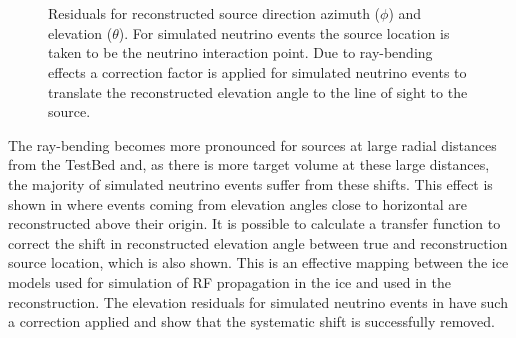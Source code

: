 \begin{figure}[htpb]
  \hfill
  \\
  \hfill
  \\
  \hfill
  \caption{Residuals for reconstructed source direction azimuth ($\phi$) and elevation ($\theta$). For simulated neutrino events the source location is taken to be the neutrino interaction point. Due to ray-bending effects a correction factor is applied for simulated neutrino events to translate the reconstructed elevation angle to the line of sight to the source.}
  \label{fig:analysis:Reconstructed:CSW-Residuals}
\end{figure}


The ray-bending becomes more pronounced for sources at large radial distances from the TestBed and, as there is more target volume at these large distances, the majority of simulated neutrino events  suffer from these shifts. This effect is shown in  where events coming from elevation angles close to horizontal are reconstructed above their origin. It is possible to calculate a transfer function to correct the shift in reconstructed elevation angle between true and reconstruction source location, which is also shown. This is an effective mapping between the ice models used for simulation of RF propagation in the ice and used in the reconstruction. The elevation residuals for simulated neutrino events in  have such a correction applied and show that the systematic shift is successfully removed.


